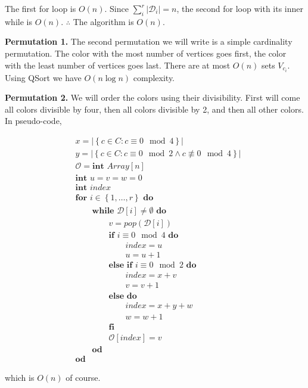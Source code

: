 \documentclass[a4paper, 12pt]{article}
\begin{document}
The first for loop is $O(n)$. Since $\sum_{i}^r |\mathcal{D}_i| = n$, the
second for loop with its inner while is $O(n)$. $\therefore $ The algorithm is
$O(n)$.

\textbf{Permutation 1.} The second permutation we will write is a simple
cardinality permutation. The color with the most number of vertices goes first,
the color with the least number of vertices goes last. There are at most $O(n)$
sets $V_{c_i}$. Using QSort we have $O(n \log n)$ complexity.


\textbf{Permutation 2.} We will order the colors using their divisibility. First will come 
all colors divisible by four, then all colors divisible by 2, and then all other 
colors. In pseudo-code, 

\begin{align*}
    &x = | \left\{ c \in C : c \equiv 0 \mod 4 \right\}  |\\
    &y = | \left\{ c \in C : c \equiv 0 \mod 2 \land c \not\equiv 0 \mod 4 \right\}  |\\
    &\mathcal{O} = \textbf{int } Array[n] \\ 
    &\textbf{int }u = v = w = 0 \\
    &\textbf{int } index\\
    &\textbf{for } i \in \left\{ 1, \ldots, r \right\}  \textbf{ do }\\ 
    &\qquad\textbf{while } \mathcal{D}[i] \neq \emptyset \textbf{ do}\\
    &\qquad\qquad v = pop(\mathcal{D}[i]) \\ 
    &\qquad\qquad \textbf{if } i \equiv 0 \mod 4 \textbf{ do} \\ 
    &\qquad \qquad \qquad index = u \\ 
    &\qquad\qquad\qquad u = u + 1 \\ 
    &\qquad\qquad\textbf{else if } i \equiv 0 \mod 2 \textbf{ do } \\ 
    &\qquad\qquad\qquad index = x + v\\ 
    &\qquad \qquad \qquad v = v + 1 \\ 
    &\qquad\qquad\textbf{else do}  \\ 
    &\qquad\qquad\qquad index = x + y + w\\ 
    &\qquad \qquad \qquad w = w + 1 \\ 
    &\qquad\qquad\textbf{fi}\\
    &\qquad\qquad \mathcal{O}[index] = v \\ 
    &\qquad\textbf{od}\\
    &\textbf{od}
\end{align*}

which is $O(n)$ of course.
\end{document}
